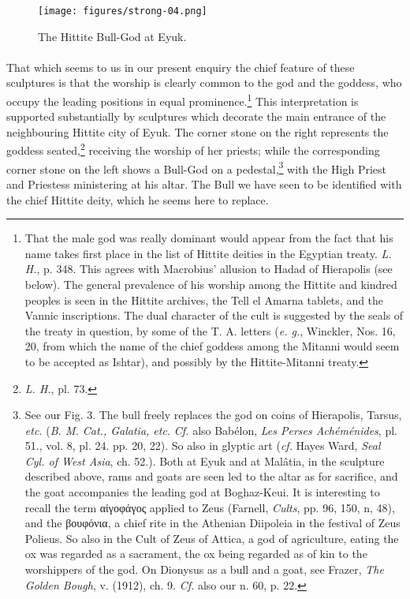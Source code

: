 \documentclass[a4paper, 11pt, oneside, polutonikogreek, english]{article}
\begin{document}
\begin{figure}[H]
\centering
\texttt{[image: figures/strong-04.png]}
\caption{The Hittite Bull-God at Eyuk.}
\end{figure}
\paragraph{}
That which seems to us in our present enquiry the chief feature of these sculptures is that the worship is clearly common to the god and the goddess, who occupy the leading positions in equal prominence.\footnote{That the male god was really dominant would appear from the fact that his name takes first place in the list of Hittite deities in the Egyptian treaty. \emph{L. H.}, p. 348. This agrees with Macrobius' allusion to Hadad of Hierapolis (see below). The general prevalence of his worship among the Hittite and kindred peoples is seen in the Hittite archives, the Tell el Amarna tablets, and the Vannic inscriptions. The dual character of the cult is suggested by the seals of the treaty in question, by some of the T. A. letters (\emph{e. g.}, Winckler, Nos. 16, 20, from which the name of the chief goddess among the Mitanni would seem to be accepted as Ishtar), and possibly by the Hittite-Mitanni treaty.} This interpretation is supported substantially by sculptures which decorate the main entrance of the neighbouring Hittite city of Eyuk. The corner stone on the right represents the goddess seated,\footnote{\emph{L. H.}, pl. 73.} receiving the worship of her priests; while the corresponding corner stone on the left shows a Bull-God on a pedestal,\footnote{See our Fig. 3. The bull freely replaces the god on coins of Hierapolis, Tarsus, \emph{etc.} (\emph{B. M. Cat., Galatia, etc.} \emph{Cf.} also Babélon, \emph{Les Perses Achéménides}, pl. 51., vol. 8, pl. 24. pp. 20, 22). So also in glyptic art (\emph{cf.} Hayes Ward, \emph{Seal Cyl. of West Asia}, ch. 52.). Both at Eyuk and at Malâtia, in the sculpture described above, rams and goats are seen led to the altar as for sacrifice, and the goat accompanies the leading god at Boghaz-Keui. It is interesting to recall the term αἰγοφάγος applied to Zeus (Farnell, \emph{Cults}, pp. 96, 150, n, 48), and the βουφόνια, a chief rite in the Athenian Diipoleia in the festival of Zeus Polieus. So also in the Cult of Zeus of Attica, a god of agriculture, eating the ox was regarded as a sacrament, the ox being regarded as of kin to the worshippers of the god. On Dionysus as a bull and a goat, see Frazer, \emph{The Golden Bough}, v. (1912), ch. 9. \emph{Cf.} also our n. 60, p. 22.} with the High Priest and Priestess ministering at his altar. The Bull we have seen to be identified with the chief Hittite deity, which he seems here to replace.
\end{document}
